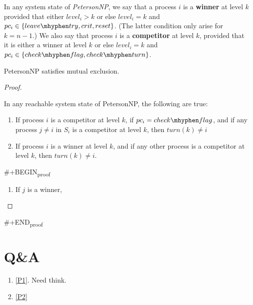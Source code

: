 \documentclass[11pt]{article}
\def \checkflag {check\mhyphen flag}
\def \checkturn {check\mhyphen turn}
\def \leavetry {leave\mhyphen try}
\def \leaveexit {leave\mhyphen exit}
\def \Effect {\qw\text{Effect:}}
\def \Precondition {\qw\text{Precondition:}}
\begin{document}
\begin{Block}{}
\begin{center}
\end{center}
\end{Block}

In any system state of \emph{PetersonNP}, we say that a process \(i\) is a \textbf{winner} at level \(k\) provided
that either \(level_i>k\) or else \(level_i=k\) and \(pc_i\in\{\leavetry,crit,reset\}\). (The latter
condition only arise for \(k=n-1\).) We also say that process \(i\) is a \textbf{competitor} at level \(k\),
provided that it is either a winner at level \(k\) or else \(level_i=k\) and
\(pc_i\in\{\checkflag,\checkturn\}\).


\begin{lemma}[]
PetersonNP satisfies mutual exclusion.
\end{lemma}

\begin{proof}
\begin{assertion}
\label{10.5.3}
In any reachable system state of PetersonNP, the following are true:
\begin{enumerate}
\item If process \(i\) is a competitor at level \(k\), if \(pc_i=\checkflag\), and if any process
\(j\neq i\) in \(S_i\) is a competitor at level \(k\), then \(turn(k)\neq i\)
\item If process \(i\) is a winner at level \(k\), and if any other process is a competitor at level
\(k\), then \(turn(k)\neq i\).
\end{enumerate}
\end{assertion}

\#+BEGIN\textsubscript{proof}
\begin{enumerate}
\item If \(j\) is a winner,
\end{enumerate}
\end{proof}
\#+END\textsubscript{proof}
\section{Q\&A}
\label{sec:orgbd63c4b}
\begin{enumerate}
\item \ref{P1}. Need think.
\item \ref{P2}
\end{enumerate}
\end{document}
